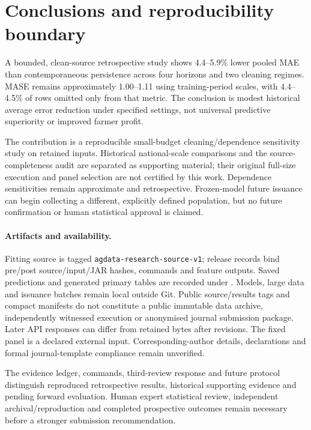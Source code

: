 \section{Conclusions and reproducibility boundary}\label{sec:conclusion}
A bounded, clean-source retrospective study shows 4.4--5.9\% lower pooled MAE than contemporaneous persistence across four horizons and two cleaning regimes. MASE remains approximately 1.00--1.11 using training-period scales, with 4.4--4.5\% of rows omitted only from that metric. The conclusion is modest historical average error reduction under specified settings, not universal predictive superiority or improved farmer profit.

The contribution is a reproducible small-budget cleaning/dependence sensitivity study on retained inputs. Historical national-scale comparisons and the source-completeness audit are separated as supporting material; their original full-size execution and panel selection are not certified by this work. Dependence sensitivities remain approximate and retrospective. Frozen-model future issuance can begin collecting a different, explicitly defined population, but no future confirmation or human statistical approval is claimed.

\paragraph{Artifacts and availability.}
Fitting source is tagged \texttt{agdata-}\allowbreak\texttt{research-}\allowbreak\texttt{source-v1}; release records bind pre/post source/input/JAR hashes, commands and feature outputs. Saved predictions and generated primary tables are recorded under . Models, large data and issuance batches remain local outside Git. Public source/results tags and compact manifests do not constitute a public immutable data archive, independently witnessed execution or anonymised journal submission package. Later API responses can differ from retained bytes after revisions. The fixed panel is a declared external input. Corresponding-author details, declarations and formal journal-template compliance remain unverified.

The evidence ledger, commands, third-review response and future protocol distinguish reproduced retrospective results, historical supporting evidence and pending forward evaluation. Human expert statistical review, independent archival/reproduction and completed prospective outcomes remain necessary before a stronger submission recommendation.
